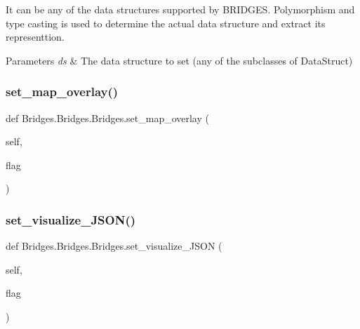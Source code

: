 It can be any of the data structures supported by B\+R\+I\+D\+G\+ES. Polymorphism and type casting is used to determine the actual data structure and extract its representtion.


\begin{DoxyParams}{Parameters}
{\em ds} & The data structure to set (any of the subclasses of Data\+Struct) \\
\hline
\end{DoxyParams}
\mbox{\label{class_bridges_1_1_bridges_1_1_bridges_a5bbbed2d5808865771bbad1439c85460}} 
\subsubsection{\texorpdfstring{set\+\_\+map\+\_\+overlay()}{set\_map\_overlay()}}
{\footnotesize\ttfamily def Bridges.\+Bridges.\+Bridges.\+set\+\_\+map\+\_\+overlay (\begin{DoxyParamCaption}\item[{}]{self,  }\item[{}]{flag }\end{DoxyParamCaption})}

\mbox{\label{class_bridges_1_1_bridges_1_1_bridges_ab7fb96498ecd5ae918ff9d1a8b345940}} 
\subsubsection{\texorpdfstring{set\+\_\+visualize\+\_\+\+J\+S\+O\+N()}{set\_visualize\_JSON()}}
{\footnotesize\ttfamily def Bridges.\+Bridges.\+Bridges.\+set\+\_\+visualize\+\_\+\+J\+S\+ON (\begin{DoxyParamCaption}\item[{}]{self,  }\item[{}]{flag }\end{DoxyParamCaption})}

